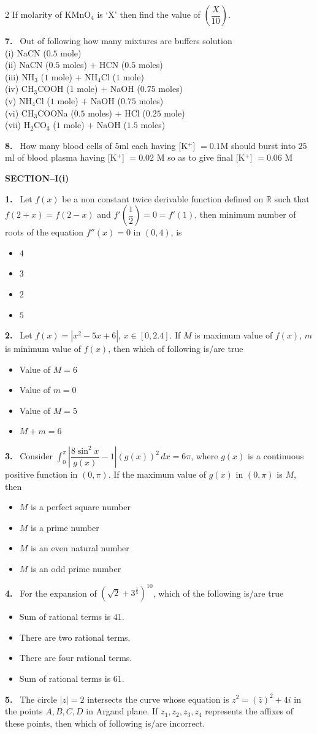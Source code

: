 \documentclass[10pt]{extarticle}
\newcommand{\partsec}[2]{\par\medskip\noindent{\large\bfseries PART-#1: #2}\par\smallskip}
\newcommand{\sect}[1]{\par\smallskip\noindent\textbf{#1}\par}
\newcommand{\qn}[1]{\par\smallskip\noindent\textbf{#1.}~}
\newenvironment{qoptions}{\begin{itemize}[leftmargin=1.8em,itemsep=1pt,topsep=2pt,label={}]}{\end{itemize}}
\newcommand{\opt}[2]{\item[(#1)] #2}
\begin{document}
\begin{multicols}{2}
If molarity of KMnO$_4$ is `X' then find the value of $\left(\dfrac{X}{10}\right)$.
\qn{7} Out of following how many mixtures are buffers solution\\
(i) NaCN ($0.5$ mole)\\
(ii) NaCN ($0.5$ moles) $+$ HCN ($0.5$ moles)\\
(iii) NH$_3$ ($1$ mole) $+$ NH$_4$Cl ($1$ mole)\\
(iv) CH$_3$COOH ($1$ mole) $+$ NaOH ($0.75$ moles)\\
(v) NH$_4$Cl ($1$ mole) $+$ NaOH ($0.75$ moles)\\
(vi) CH$_3$COONa ($0.5$ moles) $+$ HCl ($0.25$ mole)\\
(vii) H$_2$CO$_3$ ($1$ mole) $+$ NaOH ($1.5$ moles)
\qn{8} How many blood cells of $5$ml each having [K$^+$] $=0.1$M should burst into $25$ ml of blood plasma having [K$^+$] $=0.02$ M so as to give final [K$^+$] $=0.06$ M
\partsec{3}{MATHEMATICS}
\sect{SECTION--I(i)}
\qn{1} Let $f(x)$ be a non constant twice derivable function defined on $\mathbb R$ such that $f(2+x)=f(2-x)$ and $f'\!\left(\dfrac12\right)=0=f'(1)$, then minimum number of roots of the equation $f''(x)=0$ in $(0,4)$, is
\begin{qoptions}
\opt{A}{$4$}
\opt{B}{$3$}
\opt{C}{$2$}
\opt{D}{$5$}
\end{qoptions}
\qn{2} Let $f(x)=|x^2-5x+6|$, $x\in[0,2.4]$. If $M$ is maximum value of $f(x)$, $m$ is minimum value of $f(x)$, then which of following is/are true
\begin{qoptions}
\opt{A}{Value of $M=6$}
\opt{B}{Value of $m=0$}
\opt{C}{Value of $M=5$}
\opt{D}{$M+m=6$}
\end{qoptions}
\qn{3} Consider $\displaystyle\int_0^{\pi}\left|\dfrac{8\sin^2x}{g(x)}-1\right|(g(x))^2\,dx=6\pi$, where $g(x)$ is a continuous positive function in $(0,\pi)$. If the maximum value of $g(x)$ in $(0,\pi)$ is $M$, then
\begin{qoptions}
\opt{A}{$M$ is a perfect square number}
\opt{B}{$M$ is a prime number}
\opt{C}{$M$ is an even natural number}
\opt{D}{$M$ is an odd prime number}
\end{qoptions}
\qn{4} For the expansion of $\left(\sqrt2+3^{\frac15}\right)^{10}$, which of the following is/are true
\begin{qoptions}
\opt{A}{Sum of rational terms is $41$.}
\opt{B}{There are two rational terms.}
\opt{C}{There are four rational terms.}
\opt{D}{Sum of rational terms is $61$.}
\end{qoptions}
\qn{5} The circle $|z|=2$ intersects the curve whose equation is $z^2=(\bar z)^2+4i$ in the points $A,B,C,D$ in Argand plane. If $z_1,z_2,z_3,z_4$ represents the affixes of these points, then which of following is/are incorrect.

\end{multicols}
\end{document}
